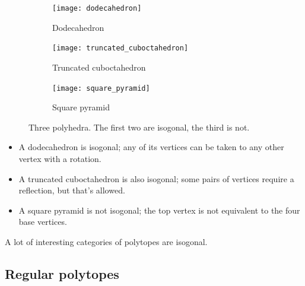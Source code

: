 \documentclass{article}
\begin{document}
\begin{figure}[H]
  \centering
  \begin{subfigure}{.33333\textwidth}
    \centering
    \texttt{[image: dodecahedron]}
    \caption{Dodecahedron}
    \label{fig:doe}
  \end{subfigure}%
  \begin{subfigure}{.33333\textwidth}
    \centering
    \texttt{[image: truncated\_cuboctahedron]}
    \caption{Truncated cuboctahedron}
    \label{fig:girco}
  \end{subfigure}%
  \begin{subfigure}{.33333\textwidth}
    \centering
    \texttt{[image: square\_pyramid]}
    \caption{Square pyramid}
    \label{fig:squippy}
  \end{subfigure}%
  \caption{Three polyhedra. The first two are isogonal, the third is not.}
  \label{fig:polyhedra1}
\end{figure}

\begin{itemize}
\item A dodecahedron is isogonal; any of its vertices can be taken to any other vertex with a
  rotation.
\item A truncated cuboctahedron is also isogonal; some pairs of vertices require a reflection, but
  that's allowed.
\item A square pyramid is not isogonal; the top vertex is not equivalent to the four base vertices.
\end{itemize}

A lot of interesting categories of polytopes are isogonal.

\subsection{Regular polytopes}
\end{document}
